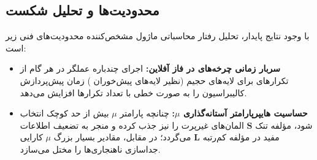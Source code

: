 \subsection{محدودیت‌ها و تحلیل شکست}
با وجود نتایج پایدار، تحلیل رفتار محاسباتی ماژول  مشخص‌کننده محدودیت‌های فنی زیر است:
\begin{itemize}
    \item \textbf{سربار زمانی چرخه‌های  در فاز آفلاین:} اجرای چندباره عملگر  در هر گام از تکرارهای  برای لایه‌های حجیم (نظیر لایه‌های پیش‌خوران ) زمان پیش‌پردازش کالیبراسیون را به صورت خطی با تعداد تکرارها افزایش می‌دهد.
    \item \textbf{حساسیت هایپرپارامتر آستانه‌گذاری $\mu$:} چنانچه پارامتر $\mu$ بیش از حد کوچک انتخاب شود، مؤلفه تنک $\mathbf{S}$ المان‌های غیرپرت را نیز جذب کرده و منجر به تضعیف اطلاعات مفید در مؤلفه کم‌رتبه $\mathbf{L}$ می‌گردد؛ در مقابل، مقادیر بسیار بزرگ $\mu$ کارایی جداسازی ناهنجاری‌ها را مختل می‌سازد.
\end{itemize}
